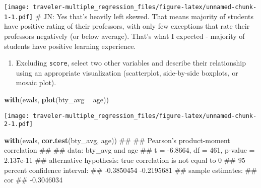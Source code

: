 \documentclass[]{article}
\newenvironment{Shaded}{\begin{snugshade}}{\end{snugshade}}
\newcommand{\KeywordTok}[1]{\textcolor[rgb]{0.13,0.29,0.53}{\textbf{#1}}}
\newcommand{\DataTypeTok}[1]{\textcolor[rgb]{0.13,0.29,0.53}{#1}}
\newcommand{\DecValTok}[1]{\textcolor[rgb]{0.00,0.00,0.81}{#1}}
\newcommand{\StringTok}[1]{\textcolor[rgb]{0.31,0.60,0.02}{#1}}
\newcommand{\OperatorTok}[1]{\textcolor[rgb]{0.81,0.36,0.00}{\textbf{#1}}}
\newcommand{\NormalTok}[1]{#1}
\providecommand{\tightlist}{%
  \setlength{\itemsep}{0pt}\setlength{\parskip}{0pt}}
\begin{document}
\begin{Shaded}
\end{Shaded}

\texttt{[image: traveler-multiple\_regression\_files/figure-latex/unnamed-chunk-1-1.pdf]}
\# JN: Yes that's heavily left skewed. That means majority of students
have positive rating of their professors, with only few exceptions that
rate their professors negatively (or below average). That's what I
expected - majority of students have positive learning experience.

\begin{enumerate}
\def\labelenumi{\arabic{enumi}.}
\setcounter{enumi}{2}
\tightlist
\item
  Excluding \texttt{score}, select two other variables and describe
  their relationship using an appropriate visualization (scatterplot,
  side-by-side boxplots, or mosaic plot).
\end{enumerate}

\begin{Shaded}
\begin{Highlighting}[]
\KeywordTok{with}\NormalTok{(evals, }
     \KeywordTok{plot}\NormalTok{(bty_avg }\OperatorTok{~}\StringTok{ }\NormalTok{age))}
\end{Highlighting}
\end{Shaded}

\texttt{[image: traveler-multiple\_regression\_files/figure-latex/unnamed-chunk-2-1.pdf]}

\begin{Shaded}
\begin{Highlighting}[]
\KeywordTok{with}\NormalTok{(evals,}
     \KeywordTok{cor.test}\NormalTok{(bty_avg, age))}
\NormalTok{## }
\NormalTok{##  Pearson's product-moment correlation}
\NormalTok{## }
\NormalTok{## data:  bty_avg and age}
\NormalTok{## t = -6.8664, df = 461, p-value = 2.137e-11}
\NormalTok{## alternative hypothesis: true correlation is not equal to 0}
\NormalTok{## 95 percent confidence interval:}
\NormalTok{##  -0.3850454 -0.2195681}
\NormalTok{## sample estimates:}
\NormalTok{##        cor }
\NormalTok{## -0.3046034}
\end{Highlighting}
\end{Shaded}
\end{document}

